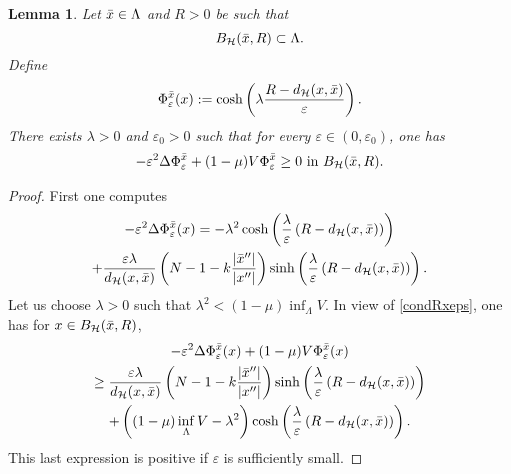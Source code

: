 \documentclass[a4paper]{amsart}
\newtheorem{lemma}[proposition]{Lemma}
\begin{document}
\begin{lemma}\label{CompPeak}
Let $\Bar{x} \in \Lambda$ and $R > 0$ be such that 
\begin{equation}
\label{condRxeps}
 B_{\mathcal{H}}(\Bar{x},R) \subset \Lambda.
\end{equation} 
Define
\begin{align}\label{def:Phieps}
 
\Phi_{\varepsilon}^{\Bar{x}}(x) := \cosh \left( \lambda \frac{R-d_{\mathcal{H}}(x,\Bar{x})}{\varepsilon}\right).
\end{align}
There exists $\lambda > 0$ and $\varepsilon_0 > 0$ such that for every $\varepsilon \in (0,\varepsilon_0)$, one has
\begin{align*}
 -\varepsilon^2 \Delta \Phi^{\Bar{x}}_{\varepsilon} + (1-\mu) V \Phi^{\Bar{x}}_{\varepsilon} \geq 0 \ \text{in}\
B_\mathcal{H}(\Bar{x},R).
\end{align*}
\end{lemma}
\begin{proof}
First one computes
\begin{multline*}
 -\varepsilon^2\Delta \Phi^{\Bar{x}}_\varepsilon(x)=-\lambda^2 \cosh\left(\frac{\lambda}{\varepsilon}\left(R-d_{\mathcal{H}}(x,
\Bar{x})\right)\right) \\
+\frac{\varepsilon \lambda}{d_{\mathcal{H}}(x, \Bar{x})} \left( N-1
 - k \frac{{\left| {\Bar{x}''} \right|}}{{\left| {x''} \right|}} \right)
\sinh\left(\frac{\lambda}{\varepsilon}\left(R-d_{\mathcal{H}}(x, \Bar{x})\right)\right).
\end{multline*}
Let us choose $\lambda > 0$ such that $\lambda^2 < (1-\mu) \inf_{\Lambda} V$. 
In view of \eqref{condRxeps}, one has for $x \in B_{\mathcal{H}}(\Bar{x}, R)$, 
\begin{multline*}
 -\varepsilon^2\Delta \Phi^{\Bar{x}}_\varepsilon(x)+ (1-\mu) V \Phi^{\Bar{x}}_\varepsilon(x) \\ 
\geq \frac{\varepsilon \lambda}{d_{\mathcal{H}}(x, \Bar{x})} \left( N-1
 - k \frac{{\left| {\Bar{x}''} \right|}}{{\left| {x''} \right|}} \right)
 \sinh\left(\frac{\lambda}{\varepsilon}\left(R-d_{\mathcal{H}}(x, \Bar{x})\right)\right) \\
 + \left( (1-\mu) \inf_{\Lambda} V - \lambda^2 \right) 
 \cosh\left(\frac{\lambda}{\varepsilon}\left(R-d_{\mathcal{H}}(x, \Bar{x})\right)\right).
\end{multline*}
This last expression is positive if $\varepsilon$ is sufficiently small.
\end{proof}
\end{document}
